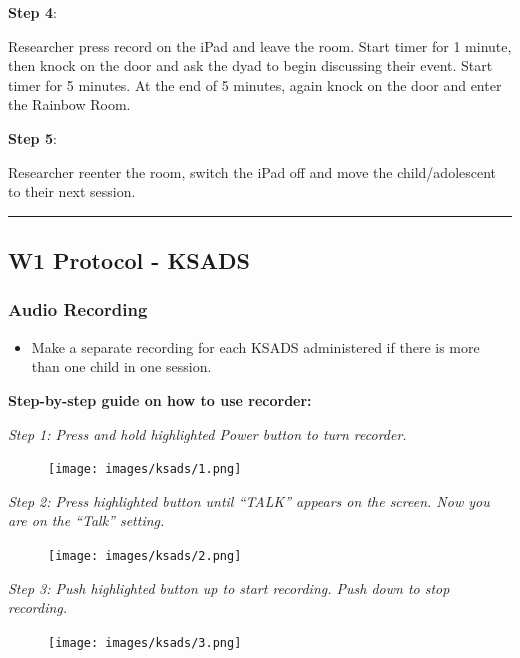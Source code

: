 \documentclass[
]{book}
\providecommand{\tightlist}{%
  \setlength{\itemsep}{0pt}\setlength{\parskip}{0pt}}
\begin{document}
\textbf{Step 4}:

Researcher press record on the iPad and leave the room. Start timer for 1 minute, then knock on the door and ask the dyad to begin discussing their event. Start timer for 5 minutes. At the end of 5 minutes, again knock on the door and enter the Rainbow Room.

\textbf{Step 5}:

Researcher reenter the room, switch the iPad off and move the child/adolescent to their next session.

\begin{center}\rule{0.5\linewidth}{0.5pt}\end{center}

\hypertarget{w1-protocol---ksads}{%
\subsection{W1 Protocol - KSADS}\label{w1-protocol---ksads}}

\hypertarget{audio-recording}{%
\subsubsection{Audio Recording}\label{audio-recording}}

\begin{itemize}
\tightlist
\item
  Make a separate recording for each KSADS administered if there is more than one child in one session.
\end{itemize}

\textbf{Step-by-step guide on how to use recorder:}

\emph{Step 1: Press and hold highlighted Power button to turn recorder.}

\begin{figure}
\centering
\texttt{[image: images/ksads/1.png]}
\caption{}
\end{figure}

\emph{Step 2: Press highlighted button until ``TALK'' appears on the screen. Now you are on the ``Talk'' setting.}

\begin{figure}
\centering
\texttt{[image: images/ksads/2.png]}
\caption{}
\end{figure}

\emph{Step 3: Push highlighted button up to start recording. Push down to stop recording.}

\begin{figure}
\centering
\texttt{[image: images/ksads/3.png]}
\caption{}
\end{figure}
\end{document}
